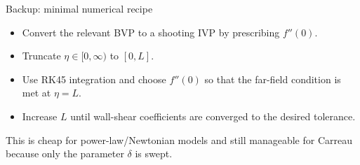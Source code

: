 \documentclass[aspectratio=169,11pt]{beamer}
\begin{document}
\begin{frame}{Backup: minimal numerical recipe}
\begin{itemize}
  \item Convert the relevant BVP to a shooting IVP by prescribing $f''(0)$.
  \item Truncate $\eta\in[0,\infty)$ to $[0,L]$.
  \item Use RK45 integration and choose $f''(0)$ so that the far-field condition is met at $\eta=L$.
  \item Increase $L$ until wall-shear coefficients are converged to the desired tolerance.
\end{itemize}
\vspace{0.4em}
\begin{center}
This is cheap for power-law/Newtonian models and still manageable for Carreau because only the parameter $\delta$ is swept.
\end{center}
\end{frame}
\end{document}
